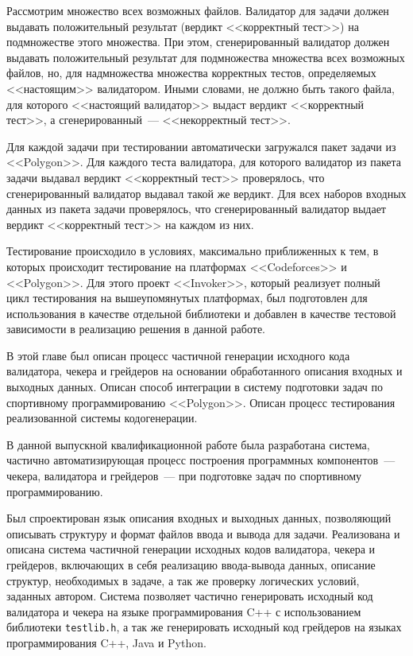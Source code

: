 \documentclass[times,specification,annotation]{style/itmo-student-thesis/itmo-student-thesis}
\begin{document}
Рассмотрим множество всех возможных файлов. Валидатор для задачи должен выдавать положительный результат (вердикт <<корректный тест>>) на подмножестве этого множества. При этом, сгенерированный валидатор должен выдавать положительный результат для подмножества множества всех возможных файлов, но, для надмножества множества корректных тестов, определяемых <<настоящим>> валидатором. Иными словами, не должно быть такого файла, для которого <<настоящий валидатор>> выдаст вердикт <<корректный тест>>, а сгенерированный~--- <<некорректный тест>>.

Для каждой задачи при тестировании автоматически загружался пакет задачи из <<Polygon>>. Для каждого теста валидатора, для которого валидатор из пакета задачи выдавал вердикт <<корректный тест>> проверялось, что сгенерированный валидатор выдавал такой же вердикт. Для всех наборов входных данных из пакета задачи проверялось, что сгенерированный валидатор выдает вердикт <<корректный тест>> на каждом из них. 

Тестирование происходило в условиях, максимально приближенных к тем, в которых происходит тестирование на платформах <<Codeforces>> и <<Polygon>>. Для этого проект <<Invoker>>, который реализует полный цикл тестирования на вышеупомянутых платформах, был подготовлен для использования в качестве отдельной библиотеки и добавлен в качестве тестовой зависимости в реализацию решения в данной работе.

\chapterconclusion

В этой главе был описан процесс частичной генерации исходного кода валидатора, чекера и грейдеров на основании обработанного описания входных и выходных данных. Описан способ интеграции в систему подготовки задач по спортивному программированию <<Polygon>>. Описан процесс тестирования реализованной системы кодогенерации.

\startconclusionpage

В данной выпускной квалификационной работе была разработана система, частично автоматизирующая процесс построения программных компонентов~--- чекера, валидатора и грейдеров~--- при подготовке задач по спортивному программированию.

Был спроектирован язык описания входных и выходных данных, позволяющий описывать структуру и формат файлов ввода и вывода для задачи. Реализована и описана система частичной генерации исходных кодов валидатора, чекера и грейдеров, включающих в себя реализацию ввода-вывода данных, описание структур, необходимых в задаче, а так же проверку логических условий, заданных автором. Система позволяет частично генерировать исходный код валидатора и чекера на языке программирования C++ с использованием библиотеки \texttt{testlib.h}, а так же генерировать исходный код грейдеров на языках программирования C++, Java и Python.
\end{document}
